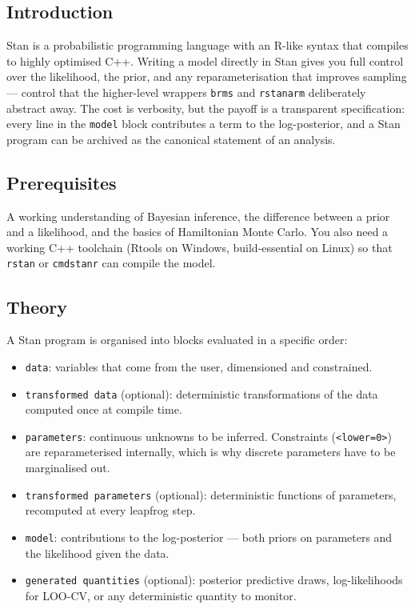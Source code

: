 \documentclass[
]{article}
\author{}
\date{\vspace{-2.5em}}
\providecommand{\tightlist}{%
  \setlength{\itemsep}{0pt}\setlength{\parskip}{0pt}}
\begin{document}
\subsection{Introduction}\label{introduction}

Stan is a probabilistic programming language with an R-like syntax that
compiles to highly optimised C++. Writing a model directly in Stan gives
you full control over the likelihood, the prior, and any
reparameterisation that improves sampling --- control that the
higher-level wrappers \texttt{brms} and \texttt{rstanarm} deliberately
abstract away. The cost is verbosity, but the payoff is a transparent
specification: every line in the \texttt{model} block contributes a term
to the log-posterior, and a Stan program can be archived as the
canonical statement of an analysis.

\subsection{Prerequisites}\label{prerequisites}

A working understanding of Bayesian inference, the difference between a
prior and a likelihood, and the basics of Hamiltonian Monte Carlo. You
also need a working C++ toolchain (Rtools on Windows, build-essential on
Linux) so that \texttt{rstan} or \texttt{cmdstanr} can compile the
model.

\subsection{Theory}\label{theory}

A Stan program is organised into blocks evaluated in a specific order:

\begin{itemize}
\tightlist
\item
  \texttt{data}: variables that come from the user, dimensioned and
  constrained.
\item
  \texttt{transformed\ data} (optional): deterministic transformations
  of the data computed once at compile time.
\item
  \texttt{parameters}: continuous unknowns to be inferred. Constraints
  (\texttt{\textless{}lower=0\textgreater{}}) are reparameterised
  internally, which is why discrete parameters have to be marginalised
  out.
\item
  \texttt{transformed\ parameters} (optional): deterministic functions
  of parameters, recomputed at every leapfrog step.
\item
  \texttt{model}: contributions to the log-posterior --- both priors on
  parameters and the likelihood given the data.
\item
  \texttt{generated\ quantities} (optional): posterior predictive draws,
  log-likelihoods for LOO-CV, or any deterministic quantity to monitor.
\end{itemize}
\end{document}
